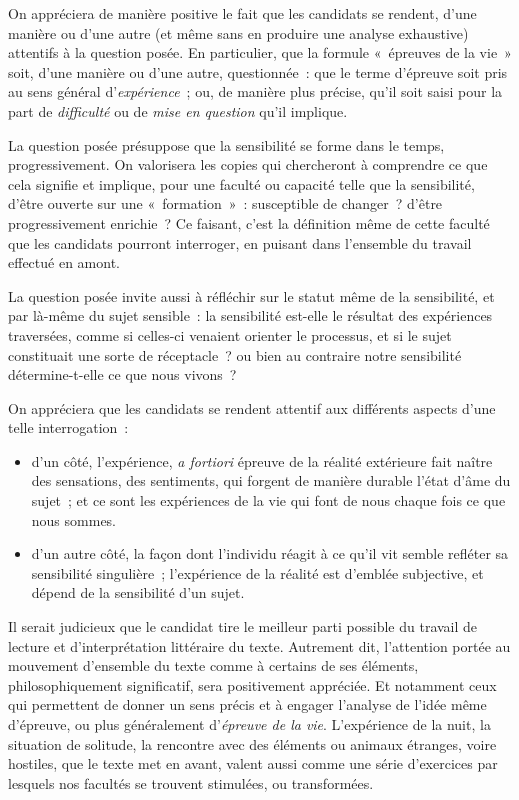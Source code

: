 {On appréciera de manière positive le fait que les candidats se rendent, d'une
manière ou d'une autre (et même sans en produire une analyse exhaustive) attentifs
à la question posée. En particulier, que la formule «~épreuves de la vie~» soit, d'une
manière ou d'une autre, questionnée~: que le terme d'épreuve soit pris au sens général
d'\textit{expérience}~; ou, de manière plus précise, qu'il soit saisi pour la part de \textit{difficulté} ou
de \textit{mise en question} qu'il implique.

La question posée présuppose que la sensibilité se forme dans le temps,
progressivement. On valorisera les copies qui chercheront à comprendre ce que cela
signifie et implique, pour une faculté ou capacité telle que la sensibilité, d'être ouverte
sur une «~formation~»~: susceptible de changer~? d'être progressivement enrichie~? Ce
faisant, c'est la définition même de cette faculté que les candidats pourront interroger,
en puisant dans l'ensemble du travail effectué en amont.

La question posée invite aussi à réfléchir sur le statut même de la sensibilité, et
par là-même du sujet sensible~: la sensibilité est-elle le résultat des expériences
traversées, comme si celles-ci venaient orienter le processus, et si le sujet constituait
une sorte de réceptacle~? ou bien au contraire notre sensibilité détermine-t-elle ce que
nous vivons~?

On appréciera que les candidats se rendent attentif aux différents aspects d'une
telle interrogation~:

\begin{itemize}
\item d'un côté, l'expérience, \textit{a fortiori} épreuve de la réalité extérieure fait naître
des sensations, des sentiments, qui forgent de manière durable l'état d'âme
du sujet~; et ce sont les expériences de la vie qui font de nous chaque fois
ce que nous sommes.
\item d'un autre côté, la façon dont l'individu réagit à ce qu'il vit semble refléter sa
sensibilité singulière~; l'expérience de la réalité est d'emblée subjective, et
dépend de la sensibilité d'un sujet.
\end{itemize}

Il serait judicieux que le candidat tire le meilleur parti possible du travail de
lecture et d'interprétation littéraire du texte. Autrement dit, l'attention portée au
mouvement d'ensemble du texte comme à certains de ses éléments,
philosophiquement significatif, sera positivement appréciée. Et notamment ceux qui
permettent de donner un sens précis et à engager l'analyse de l'idée même d'épreuve,
ou plus généralement d'\textit{épreuve de la vie}. L'expérience de la nuit, la situation de
solitude, la rencontre avec des éléments ou animaux étranges, voire hostiles, que le
texte met en avant, valent aussi comme une série d'exercices par lesquels nos facultés
se trouvent stimulées, ou transformées.

}
